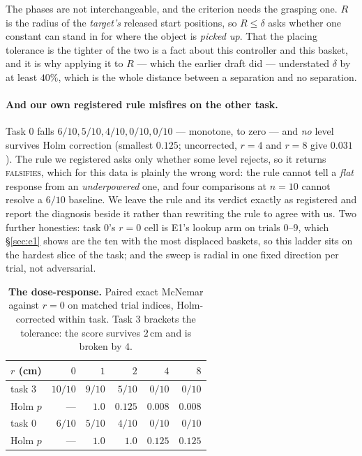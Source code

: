 \documentclass[10pt,twocolumn]{article}
\begin{document}
The phases are not interchangeable, and the criterion needs the grasping one.
$R$ is the radius of the \emph{target's} released start positions, so
$R \le \delta$ asks whether one constant can stand in for where the object is
\emph{picked up}. That the placing tolerance is the tighter of the two is a
fact about this controller and this basket, and it is why applying it to $R$
--- which the earlier draft did --- understated $\delta$ by at least $40\%$,
which is the whole distance between a separation and no separation.

\paragraph{And our own registered rule misfires on the other task.} Task $0$
falls $6/10, 5/10, 4/10, 0/10, 0/10$ --- monotone, to zero --- and \emph{no}
level survives Holm correction (smallest $0.125$; uncorrected, $r = 4$ and
$r=8$ give $0.031$). The rule we registered asks only whether some level
rejects, so it returns \textsc{falsifies}, which for this data is plainly the
wrong word: the rule cannot tell a \emph{flat} response from an
\emph{underpowered} one, and four comparisons at $n{=}10$ cannot resolve a
$6/10$ baseline. We leave the rule and its verdict exactly as registered and
report the diagnosis beside it rather than rewriting the rule to agree with us.
Two further honesties: task $0$'s $r{=}0$ cell is E1's lookup arm on trials
$0$--$9$, which \S\ref{sec:e1} shows are the ten with the most displaced
baskets, so this ladder sits on the hardest slice of the task; and the sweep is
radial in one fixed direction per trial, not adversarial.

\begin{table}[h]\centering\footnotesize
\setlength{\tabcolsep}{4.5pt}
\begin{tabular}{lrrrrr}
\toprule
$r$ (cm) & $0$ & $1$ & $2$ & $4$ & $8$ \\
\midrule
task $3$ & $10/10$ & $9/10$ & $5/10$ & $0/10$ & $0/10$ \\
\quad Holm $p$ & --- & $1.0$ & $0.125$ & $\mathbf{0.008}$ & $\mathbf{0.008}$ \\
\addlinespace
task $0$ & $6/10$ & $5/10$ & $4/10$ & $0/10$ & $0/10$ \\
\quad Holm $p$ & --- & $1.0$ & $1.0$ & $0.125$ & $0.125$ \\
\bottomrule
\end{tabular}
\caption{\textbf{The dose-response.} Paired exact McNemar against $r=0$ on
matched trial indices, Holm-corrected within task. Task $3$ brackets the
tolerance: the score survives $2$\,cm and is broken by $4$.}
\label{tab:jitter}
\end{table}
\end{document}
